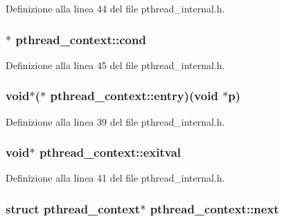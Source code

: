 Definizione alla linea 44 del file pthread\+\_\+internal.\+h.

\hypertarget{structpthread__context_ace03687a8a5dc35db9e23fdc96bf0667}{
\subsubsection[{cond}]{$\ast$ pthread\+\_\+context\+::cond}}\label{structpthread__context_ace03687a8a5dc35db9e23fdc96bf0667}


Definizione alla linea 45 del file pthread\+\_\+internal.\+h.

\hypertarget{structpthread__context_a688eabe4cd81d34bed6c73abd442f54a}{
\subsubsection[{entry}]{\setlength{\rightskip}{0pt plus 5cm}void$\ast$($\ast$ pthread\+\_\+context\+::entry)(void $\ast$p)}}\label{structpthread__context_a688eabe4cd81d34bed6c73abd442f54a}


Definizione alla linea 39 del file pthread\+\_\+internal.\+h.

\hypertarget{structpthread__context_ab2848ec5b075681f217e57545f986c1b}{
\subsubsection[{exitval}]{\setlength{\rightskip}{0pt plus 5cm}void$\ast$ pthread\+\_\+context\+::exitval}}\label{structpthread__context_ab2848ec5b075681f217e57545f986c1b}


Definizione alla linea 41 del file pthread\+\_\+internal.\+h.

\hypertarget{structpthread__context_a876fe0d5cfa5b9886c90e5936b98f992}{
\subsubsection[{next}]{\setlength{\rightskip}{0pt plus 5cm}struct {\bf pthread\+\_\+context}$\ast$ pthread\+\_\+context\+::next}}\label{structpthread__context_a876fe0d5cfa5b9886c90e5936b98f992}


